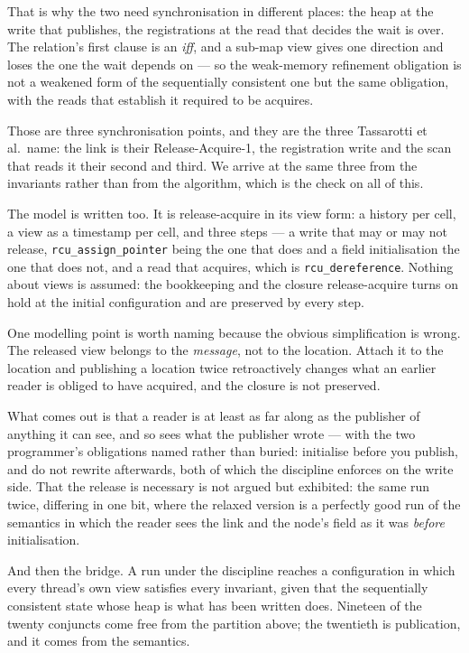 That is why the two need synchronisation in different places: the heap at the
write that publishes, the registrations at the read that decides the wait is
over.  The relation's first clause is an \emph{iff}, and a sub-map view gives
one direction and loses the one the wait depends on --- so the weak-memory
refinement obligation is not a weakened form of the sequentially consistent one
but the same obligation, with the reads that establish it required to be
acquires.

Those are three synchronisation points, and they are the three Tassarotti et
al.\ name: the link is their Release-Acquire-1, the registration write and the
scan that reads it their second and third.  We arrive at the same three from the
invariants rather than from the algorithm, which is the check on all of this.

The model is written too.  It is release-acquire in its view form: a history
per cell, a view as a timestamp per cell, and three steps --- a write that may
or may not release, \texttt{rcu\_assign\_pointer} being the one that does and
a field initialisation the one that does not, and a read that acquires, which
is \texttt{rcu\_dereference}.  Nothing about views is assumed: the
bookkeeping and the closure release-acquire turns on hold at the initial
configuration and are preserved by every step.

One modelling point is worth naming because the obvious simplification is
wrong.  The released view belongs to the \emph{message}, not to the location.
Attach it to the location and publishing a location twice retroactively changes
what an earlier reader is obliged to have acquired, and the closure is not
preserved.

What comes out is that a reader is at least as far along as the publisher of
anything it can see, and so sees what the publisher wrote --- with the two
programmer's obligations named rather than buried: initialise before you
publish, and do not rewrite afterwards, both of which the \frsh{} discipline
enforces on the write side.  That the release is necessary is not argued but
exhibited: the same run twice, differing in one bit, where the relaxed version
is a perfectly good run of the semantics in which the reader sees the link and
the node's field as it was \emph{before} initialisation.

And then the bridge.  A run under the discipline reaches a configuration in
which every thread's own view satisfies every invariant, given that the
sequentially consistent state whose heap is what has been written does.
Nineteen of the twenty conjuncts come free from the partition above; the
twentieth is publication, and it comes from the semantics.

